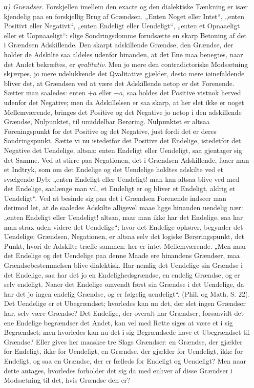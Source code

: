\documentclass[12pt,a4paper]{book}
\begin{document}
\emph{α) Grændser.} Forskjellen imellem den exacte og den
dialektiske Tænkning er især kjendelig paa en forskjellig Brug
af Grændsen. „Enten Noget eller Intet“, „enten Positivt
eller Negativt“, „enten Endeligt eller Uendeligt“, „enten et
Opnaaeligt eller et Uopnaaeligt“: slige Sondringsdomme forudsætte
en skarp Betoning af det i Grændsen Adskillende.
Den skarpt adskillende Grændse, den Grændse, der holder de
Adskilte saa aldeles udenfor hinanden, at det Ene maa benegtes,
naar det Andet bekræftes, er \emph{qvalitativ}. Men jo
mere den contradictoriske Modsætning skjærpes, jo mere udelukkende
det Qvalitative gjælder, desto mere iøinefaldende bliver
det, at Grændsen ved at være det Adskillende netop er det
Forenende. Sætter man saaledes: enten $+a$ eller $-a$,
saa holdes det Positive vistnok herved udenfor det Negative;
men da Adskillelsen er saa skarp, at her slet ikke er noget
Mellemværende, bringes det Positive og det Negative jo netop
i den adskillende Grændse, Nulpunktet, til umiddelbar Berøring.
Nulpunktet er altsaa Foreningspunkt for det Positive
og det Negative, just fordi det er deres Sondringspunkt.
Sætte vi nu istedetfor det Positive det Endelige, istedetfor det
Negative det Uendelige, altsaa: enten Endeligt eller Uendeligt,
saa gjentager sig det Samme. Ved at stirre paa Negationen,
det i Grændsen Adskillende, faaer man et Indtryk,
som om det Endelige og det Uendelige holdtes adskilte ved
et svælgende Dyb: „enten Endeligt eller Uendeligt! man kan
altsaa blive ved med det Endelige, saalænge man vil, et
Endeligt er og bliver et Endeligt, aldrig et Uendeligt“. Ved
at besinde sig paa det i Grændsen Forenende indseer man
derimod let, at de saaledes Adskilte alligevel maae ligge hinanden
uendelig nær: „enten Endeligt eller Uendeligt! altsaa,
naar man ikke har det Endelige, saa har man strax uden
videre det Uendelige“; hvor det Endelige ophører, begynder det
Uendelige; Grændsen, Negationen, er altsaa selv det logiske
Berøringspunkt, det Punkt, hvori de Adskilte træffe sammen:
her er intet Mellemværende. „Men naar det Endelige og det
Uendelige paa denne Maade ere hinandens Grændser, maa
Grændsebestemmelsen blive dialektisk. Har nemlig det Uendelige
sin Grændse i det Endelige, saa har det jo en Endelighedsgrændse,
en endelig Grændse, og er selv endeligt. Naaer
det Endelige omvendt først sin Grændse i det Uendelige, da
har det jo ingen endelig Grændse, og er følgelig uendeligt“.
(Phil. og Math. S. 22). Det Uendelige er et Ubegrændset;
hvorledes kan nu det, der slet ingen Grændser har, selv være
Grændse? Det Endelige, der overalt har Grændser, forsaavidt
det ene Endelige begrændser det Andet, kan vel med
Rette siges at være et i sig Begrændset; men hvorledes kan
nu det i sig Begrændsede have et Ubegrændset til Grændse?
Eller gives her maaskee tre Slags Grændser: en Grændse,
der gjælder for Endeligt, ikke for Uendeligt, en Grændse, der
gjælder for Uendeligt, ikke for Endeligt, og saa en Grændse,
der er fælleds for Endeligt og Uendeligt? Men naar dette
antages, hvorledes forholder det sig da med enhver af disse
Grændser i Modsætning til det, hvis Grændse den er?
\end{document}
